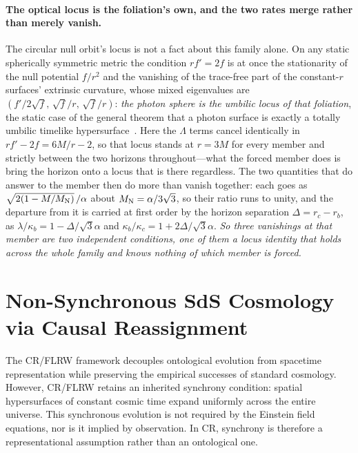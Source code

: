 \documentclass[11pt,a4paper]{article}
\theoremstyle{plain}
\theoremstyle{definition}
\theoremstyle{remark}
\begin{document}
\paragraph{The optical locus is the foliation's own, and the two rates merge rather than merely vanish.}
The circular null orbit's locus is not a fact about this family alone. On any static spherically symmetric
metric the condition $rf'=2f$ is at once the stationarity of the null potential $f/r^{2}$ and the vanishing of
the trace-free part of the constant-$r$ surfaces' extrinsic curvature, whose mixed eigenvalues are
$(f'/2\sqrt f,\,\sqrt f/r,\,\sqrt f/r)$: \emph{the photon sphere is the umbilic locus of that foliation}, the static case of the general theorem that a photon surface is exactly a totally umbilic timelike hypersurface~\cite{ClaudelVirbhadraEllis2001}.
Here the $\Lambda$ terms cancel identically in $rf'-2f=6M/r-2$, so that locus stands at $r=3M$ for every
member and strictly between the two horizons throughout---what the forced member does is bring the
horizon onto a locus that is there regardless. The two quantities that do answer to the member then do more
than vanish together: each goes as $\sqrt{2(1-M/M_{\rm N})}\,/\alpha$ about $M_{\rm N}=\alpha/3\sqrt3$,
so their ratio runs to unity, and the departure from it is carried at first order by the horizon separation
$\Delta=r_{c}-r_{b}$, as $\lambda/\kappa_{b}=1-\Delta/\sqrt3\alpha$ and
$\kappa_{b}/\kappa_{c}=1+2\Delta/\sqrt3\alpha$. \emph{So three vanishings at that member are two
independent conditions, one of them a locus identity that holds across the whole family and knows nothing of
which member is forced.}

\section{Non-Synchronous SdS Cosmology via Causal Reassignment}\label{sec:sds-cosmology}
\label{sec:CR-SdS}

The CR/FLRW framework decouples ontological evolution from spacetime representation while preserving the empirical successes of standard cosmology. However, CR/FLRW retains an inherited synchrony condition: spatial hypersurfaces of constant cosmic time expand uniformly across the entire universe. This synchronous evolution is not required by the Einstein field equations, nor is it implied by observation. In CR, synchrony is therefore a representational assumption rather than an ontological one.
\end{document}
